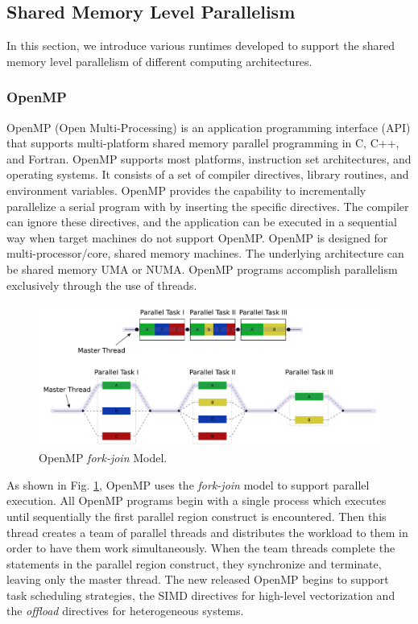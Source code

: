 \subsection{Shared Memory Level Parallelism}

In this section, we introduce various runtimes developed to support the shared memory level parallelism of different computing architectures. 

\subsubsection{OpenMP}

OpenMP (Open Multi-Processing) \cite{dagum1998openmp} is an application programming interface (API) that supports multi-platform shared memory parallel programming in C, C++, and Fortran. OpenMP supports most platforms, instruction set architectures, and operating systems. It consists of a set of compiler directives, library routines, and environment variables. OpenMP provides the capability to incrementally parallelize a serial program with by inserting the specific directives. The compiler can ignore these directives, and the application can be executed in a sequential way when target machines do not support OpenMP. OpenMP is designed for multi-processor/core, shared memory machines. The underlying architecture can be shared memory UMA or NUMA. OpenMP programs accomplish parallelism exclusively through the use of threads.

\begin{figure}[htbp]
	\centering
	\includegraphics[width=6.4in]{fig/Fork_join.pdf}
	\caption{OpenMP \textit{fork-join} Model.}
	\label{openmp_fork_join}
\end{figure}

As shown in Fig. \ref{openmp_fork_join}, OpenMP uses the \textit{fork-join} model to support parallel execution. All OpenMP programs begin with a single process which executes until sequentially the first parallel region construct is encountered.  Then this thread creates a team of parallel threads and distributes the workload to them in order to have them work simultaneously. When the team threads complete the statements in the parallel region construct, they synchronize and terminate, leaving only the master thread. The new released OpenMP begins to support task scheduling strategies, the SIMD directives for high-level vectorization and the \textit{offload} directives for heterogeneous systems.


